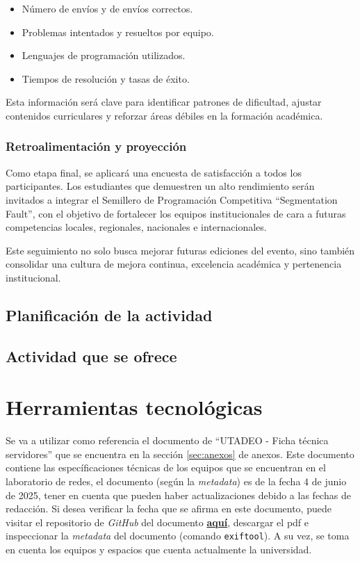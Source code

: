 \documentclass{article}
\begin{document}
\begin{itemize}
  \item Número de envíos y de envíos correctos.
  \item Problemas intentados y resueltos por equipo.
  \item Lenguajes de programación utilizados.
  \item Tiempos de resolución y tasas de éxito.
\end{itemize}

Esta información será clave para identificar patrones de dificultad, ajustar contenidos curriculares y reforzar áreas débiles en la formación académica.

\subsubsection{Retroalimentación y proyección}

Como etapa final, se aplicará una encuesta de satisfacción a todos los participantes. Los estudiantes que demuestren un alto rendimiento serán invitados a integrar el Semillero de Programación Competitiva “Segmentation Fault”, con el objetivo de fortalecer los equipos institucionales de cara a futuras competencias locales, regionales, nacionales e internacionales.

Este seguimiento no solo busca mejorar futuras ediciones del evento, sino también consolidar una cultura de mejora continua, excelencia académica y pertenencia institucional.


\subsection{Planificación de la actividad}

\subsection{Actividad que se ofrece}

\section{Herramientas tecnológicas}

Se va a utilizar como referencia el documento de ``UTADEO - Ficha técnica servidores'' que se encuentra en la sección \ref{sec:anexos} de anexos. Este documento contiene las específicaciones técnicas de los equipos que se encuentran en el laboratorio de redes, el documento (según la \textit{metadata}) es de la fecha 4 de junio de 2025, tener en cuenta que pueden haber actualizaciones debido a las fechas de redacción. Si desea verificar la fecha que se afirma en este documento, puede visitar el repositorio de \textit{GitHub} del documento \href{https://github.com/SegmentationFaultUtadeo/PropuestaMaratonUtadeo/blob/main/Bibliografia/FichaTecnica.pdf}{\textbf{aquí}}, descargar el pdf e inspeccionar la \textit{metadata} del documento (comando \texttt{exiftool}\cite{exiftool}). A su vez, se toma en cuenta los equipos y espacios que cuenta actualmente la universidad.
\end{document}
